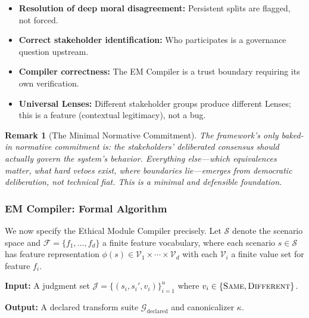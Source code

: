 \documentclass[12pt]{article}
\newtheorem{remark}[theorem]{Remark}
\begin{document}
\begin{itemize}
\item \textbf{Resolution of deep moral disagreement:} Persistent splits are flagged, not forced.
\item \textbf{Correct stakeholder identification:} Who participates is a governance question upstream.
\item \textbf{Compiler correctness:} The EM Compiler is a trust boundary requiring its own verification.
\item \textbf{Universal Lenses:} Different stakeholder groups produce different Lenses; this is a feature
(contextual legitimacy), not a bug.
\end{itemize}

\begin{remark}[The Minimal Normative Commitment]
\emph{The framework's only baked-in normative
commitment is: the stakeholders' deliberated consensus should actually govern the system's behavior.
Everything else---which equivalences matter, what hard vetoes exist, where boundaries lie---emerges
from democratic deliberation, not technical fiat. This is a minimal and defensible foundation.}
\end{remark}

\subsubsection{EM Compiler: Formal Algorithm}

We now specify the Ethical Module Compiler precisely. Let $\mathcal{S}$ denote the scenario space and
$\mathcal{F} = \{f_1, \ldots, f_d\}$ a finite feature vocabulary, where each scenario $s \in \mathcal{S}$ has feature representation
$\phi(s) \in \mathcal{V}_1 \times \cdots \times \mathcal{V}_d$ with each $\mathcal{V}_i$ a finite value set for feature $f_i$.

\textbf{Input:} A judgment set $\mathcal{J} = \{(s_i, s_i', v_i)\}_{i=1}^{n}$ where $v_i \in \{\textsc{Same}, \textsc{Different}\}$.

\textbf{Output:} A declared transform suite $\mathcal{G}_{\text{declared}}$ and canonicalizer $\kappa$.
\end{document}
